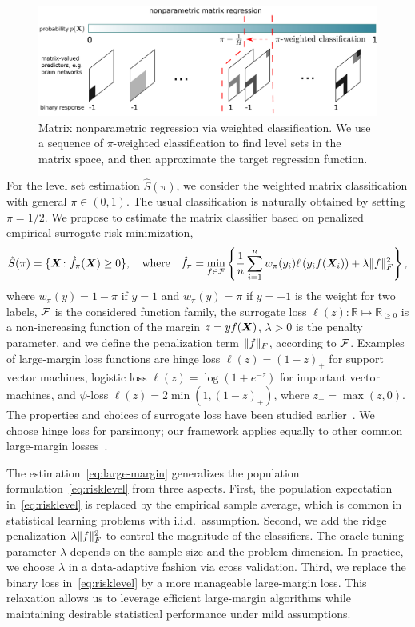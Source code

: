 \documentclass[11pt]{article}
\theoremstyle{definition}
\begin{document}
\begin{figure}[http]
\centering
\includegraphics[width=13cm]{demo_method.pdf}
\caption{Matrix nonparametric regression via weighted classification. We use a sequence of $\pi$-weighted classification to find level sets in the matrix space, and then approximate the target regression function.}\label{fig:method}
\end{figure}

For the level set estimation $\hat S(\pi)$,
we consider the weighted matrix classification with general $\pi\in(0,1)$. The usual classification is naturally obtained by setting $\pi=1/2$. We propose to estimate the matrix classifier based on penalized empirical surrogate risk minimization,
\begin{align}\label{eq:large-margin}
\hat S(\pi) = \{\bm X \colon \hat f_\pi(\bm X) \geq 0\}, \quad \text{where}\quad \hat f_\pi=\min_{f\in\mathcal{F}}\left\{ {1\over n}\sum_{i=1}^n w_{\pi}(y_i)\ell\left(y_if(\bm X_i)\right)+ \lambda \lVert f\rVert_F^2\right\},
\end{align}
where $w_\pi(y) = 1-\pi $ if $y = 1$ and $w_\pi(y)=\pi$ if $y = -1$ is the weight for two labels, $\mathcal{F}$ is the considered function family, the surrogate loss $\ell(z)\colon \mathbb{R}\mapsto \mathbb{R}_{\geq 0}$ is a non-increasing function of the margin $z=yf(\bm X)$,  $\lambda>0$ is the penalty parameter, and we define the penalization term $\lVert f\rVert_F$, according to $\mathcal{F}$.
Examples of large-margin loss functions are hinge loss $\ell(z) = (1-z)_+$ for support vector machines, logistic loss $\ell(z) =\log(1+e^{-z})$ for important vector machines, and $\psi$-loss $\ell(z)=2\min(1,(1-z)_+)$, where $z_{+}=\max(z,0)$. The properties and choices of surrogate loss have been studied earlier~\citep{scott2011surrogate,bartlett2006convexity}. We choose hinge loss for parsimony; our framework applies equally to other common large-margin losses~\citep{scott2011surrogate}.

The estimation~\eqref{eq:large-margin} generalizes the population formulation~\eqref{eq:risklevel} from three aspects. First, the population expectation in~\eqref{eq:risklevel} is replaced by the empirical sample average, which is common in statistical learning problems with i.i.d.\ assumption. Second, we add the ridge penalization $\lambda\lVert f\rVert_F^2$ to control the magnitude of the classifiers. The oracle tuning parameter $\lambda$ depends on the sample size and the problem dimension.  In practice, we choose $\lambda$ in a data-adaptive fashion via cross validation. Third, we replace the binary loss in~\eqref{eq:risklevel} by a more manageable large-margin loss. This relaxation allows us to leverage efficient large-margin algorithms while maintaining desirable statistical performance under mild assumptions. 
\end{document}

